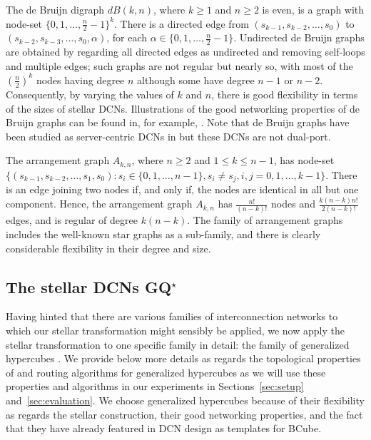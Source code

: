 \documentclass[]{amsart}
\begin{document}
The de Bruijn digraph $dB(k,n)$, where $k\geq 1$ and $n\geq 2$ is even, is a graph with node-set $\{0,1,\ldots,\frac{n}{2}-1\}^k$.  There is a directed edge from $(s_{k-1},s_{k-2},\ldots,s_0)$ to $(s_{k-2},s_{k-3},\ldots,s_0,\alpha)$, for each $\alpha\in\{0,1,\ldots,\frac{n}{2}-1\}$. Undirected de Bruijn graphs are obtained by regarding all directed edges as undirected and removing self-loops and multiple edges; such graphs are not regular but nearly so, with most of the $(\frac{n}{2})^k$ nodes having degree $n$ although some have degree $n-1$ or $n-2$. Consequently, by varying the values of $k$ and $n$, there is good flexibility in terms of the sizes of stellar DCNs. Illustrations of the good networking properties of de Bruijn graphs can be found in, for example, \cite{PradhanReddy1982,EsfahanianHakimi85}. Note that de Bruijn graphs have been studied as server-centric DCNs in \cite{PopaRatnasamyIannaccone2010} but these DCNs are not dual-port.

The arrangement graph $A_{k,n}$, where $n\geq 2$ and $1\leq k\leq n-1$, has node-set $\{(s_{k-1},s_{k-2},\ldots,s_1,s_0): s_i \in \{0,1,\ldots,n-1\}, s_i\neq s_j, i,j = 0,1, \ldots,k-1\}$. There is an edge joining two nodes if, and only if, the nodes are identical in all but one component. Hence, the arrangement graph $A_{k,n}$ has $\frac{n!}{(n-k)!}$ nodes and $\frac{k(n-k)n!}{2(n-k)!}$ edges, and is regular of degree $k(n-k)$.  The family of arrangement graphs includes the well-known star graphs as a sub-family, and there is clearly 
considerable flexibility in their degree and size.  

\subsection{The stellar DCNs GQ$^\star$}\label{sec:GQS}

Having hinted that there are various families of interconnection networks to which our stellar transformation might sensibly be applied, we now apply the stellar transformation to one specific family in detail: the family of generalized hypercubes \cite{BhuyanAgrawal1984}. We provide below more details as regards the topological properties of and routing algorithms for generalized hypercubes as we will use these properties and algorithms in our experiments in Sections~\ref{sec:setup} and~\ref{sec:evaluation}. We choose generalized hypercubes because of their flexibility as regards the stellar construction, their good networking properties, and the fact that they have already featured in DCN design as templates for BCube.
\end{document}
